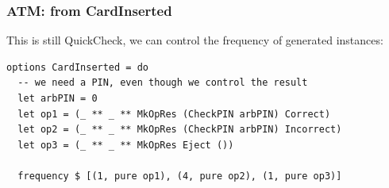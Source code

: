 \documentclass[compress,handout]{beamer}
\begin{document}
\begin{frame}[fragile]
  \frametitle{ATM: from CardInserted}

  This is still QuickCheck, we can control the frequency of generated instances:

  \begin{verbatim}
options CardInserted = do
  -- we need a PIN, even though we control the result
  let arbPIN = 0
  let op1 = (_ ** _ ** MkOpRes (CheckPIN arbPIN) Correct)
  let op2 = (_ ** _ ** MkOpRes (CheckPIN arbPIN) Incorrect)
  let op3 = (_ ** _ ** MkOpRes Eject ())

  frequency $ [(1, pure op1), (4, pure op2), (1, pure op3)]
  \end{verbatim}

\end{frame}


\end{document}
